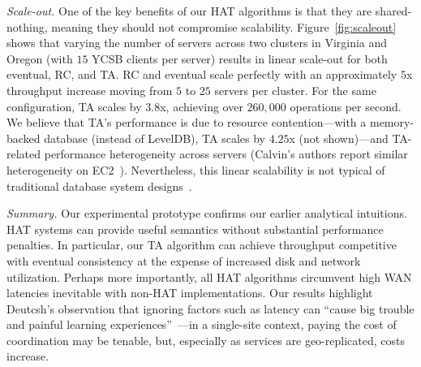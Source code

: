 \vspace{.5em}\noindent\textit{Scale-out.} One of the key benefits of
our HAT algorithms is that they are shared-nothing, meaning they
should not compromise scalability. Figure~\ref{fig:scaleout} shows
that varying the number of servers across two clusters in Virginia and
Oregon (with $15$ YCSB clients per server) results in linear scale-out
for both eventual, RC, and TA. RC and eventual scale perfectly with an
approximately $5$x throughput increase moving from $5$ to $25$ servers
per cluster. For the same configuration, TA scales by $3.8$x,
achieving over $260,000$ operations per second. We believe that TA's
performance is due to resource contention---with a memory-backed
database (instead of LevelDB), TA scales by $4.25$x (not shown)---and
TA-related performance heterogeneity across servers (Calvin's authors
report similar heterogeneity on EC2~\cite{calvin}). Nevertheless, this
linear scalability is not typical of traditional database system
designs~\cite{gray-isolation}.

\vspace{.5em}\noindent\textit{Summary.} Our experimental prototype
confirms our earlier analytical intuitions. HAT systems can provide
useful semantics without substantial performance penalties. In
particular, our TA algorithm can achieve throughput competitive with
eventual consistency at the expense of increased disk and network
utilization. Perhaps more importantly, all HAT algorithms circumvent
high WAN latencies inevitable with non-HAT implementations. Our results
highlight Deutcsh's observation that ignoring factors such as latency
can ``cause big trouble and painful learning
experiences''~\cite{fallacies-deutsch}---in a single-site context,
paying the cost of coordination may be tenable, but, especially as
services are geo-replicated, costs increase.
